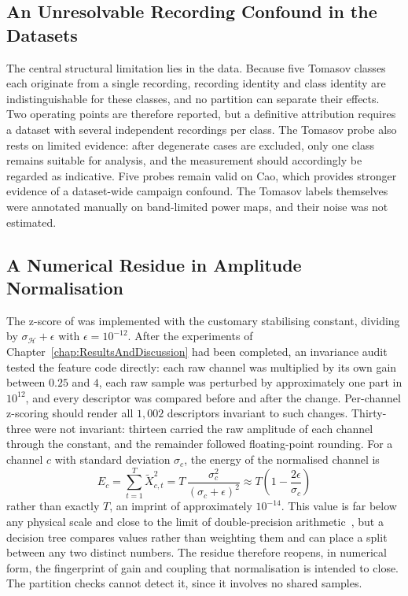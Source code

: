 \subsection{An Unresolvable Recording Confound in the Datasets}
\label{sec:chap5LimConfound}
The central structural limitation lies in the data. Because five Tomasov classes each originate from a single recording, recording identity and class identity are indistinguishable for these classes, and no partition can separate their effects. Two operating points are therefore reported, but a definitive attribution requires a dataset with several independent recordings per class. The Tomasov probe also rests on limited evidence: after degenerate cases are excluded, only one class remains suitable for analysis, and the measurement should accordingly be regarded as indicative. Five probes remain valid on Cao, which provides stronger evidence of a dataset-wide campaign confound. The Tomasov labels themselves were annotated manually on band-limited power maps, and their noise was not estimated.

\subsection{A Numerical Residue in Amplitude Normalisation}
\label{sec:chap5LimResidue}
The z-score of  was implemented with the customary stabilising constant, dividing by $\sigma_{\mathcal{H}} + \epsilon$ with $\epsilon = 10^{-12}$. After the experiments of Chapter~\ref{chap:ResultsAndDiscussion} had been completed, an invariance audit tested the feature code directly: each raw channel was multiplied by its own gain between $0.25$ and $4$, each raw sample was perturbed by approximately one part in $10^{12}$, and every descriptor was compared before and after the change. Per-channel z-scoring should render all $1{,}002$ descriptors invariant to such changes. Thirty-three were not invariant: thirteen carried the raw amplitude of each channel through the constant, and the remainder followed floating-point rounding. For a channel $c$ with standard deviation $\sigma_c$, the energy of the normalised channel is
\begin{equation}
	E_c = \sum_{t=1}^{T} \tilde{X}_{c,t}^{2} = T\,\frac{\sigma_c^{2}}{(\sigma_c + \epsilon)^{2}} \approx T\left(1 - \frac{2\epsilon}{\sigma_c}\right)
	\label{eq:residue}
\end{equation}
rather than exactly $T$, an imprint of approximately $10^{-14}$. This value is far below any physical scale and close to the limit of double-precision arithmetic~\cite{goldberg1991floating}, but a decision tree compares values rather than weighting them and can place a split between any two distinct numbers. The residue therefore reopens, in numerical form, the fingerprint of gain and coupling that normalisation is intended to close. The partition checks cannot detect it, since it involves no shared samples.

